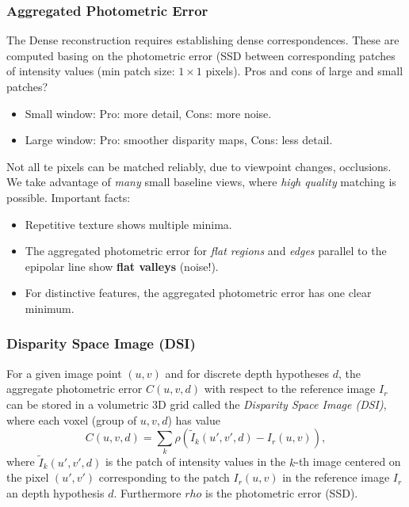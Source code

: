 \documentclass[a4paper,12 pt]{article}
\theoremstyle{definition}
\theoremstyle{remark}
\theoremstyle{definition}
\theoremstyle{definition}
\theoremstyle{definition}
\theoremstyle{remark}
\theoremstyle{definition}
\begin{document}
\subsubsection*{Aggregated Photometric Error}
The Dense reconstruction requires establishing dense correspondences. These are computed basing on the photometric error (SSD between corresponding patches of intensity values (min patch size: $1\times 1$ pixels). Pros and cons of large and small patches?
\begin{itemize}
\item Small window: Pro: more detail, Cons: more noise.
\item Large window: Pro: smoother disparity maps, Cons: less detail.
\end{itemize}
Not all te pixels can be matched reliably, due to viewpoint changes, occlusions. We take advantage of \textit{many} small baseline views, where \textit{high quality} matching is possible. Important facts:
\begin{itemize}
\item Repetitive texture shows multiple minima.
\item The aggregated photometric error for \textit{flat regions} and \textit{edges} parallel to the epipolar line show \textbf{flat valleys} (noise!).
\item For distinctive features, the aggregated photometric error has one clear minimum.
\end{itemize}
\subsubsection*{Disparity Space Image (DSI)}
For a given image point $(u,v)$ and for discrete depth hypotheses $d$, the aggregate photometric error $C(u,v,d)$ with respect to the reference image $I_r$ can be stored in a volumetric 3D grid called the \textit{Disparity Space Image (DSI)}, where each voxel (group of $u,v,d$) has value
\begin{equation}
C(u,v,d)=\sum_{k}\rho \left( \tilde{I}_k (u',v',d)-I_r(u,v)\right),
\end{equation}
where $\tilde{I}_k (u',v',d)$ is the patch of intensity values in the $k$-th image centered on the pixel $(u',v')$ corresponding to the patch $I_r(u,v)$ in the reference image $I_r$ an depth hypothesis $d$. Furthermore $rho$ is the photometric error (SSD).
\end{document}
